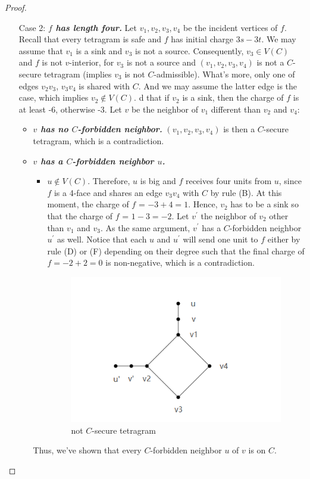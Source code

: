 \begin{proof}
\begin{itemize}
    \item[Case 2: ] \textit{\textbf{$f$ has length four.}} Let $v_1, v_2, v_3, v_4$ be the incident vertices of $f$. Recall that every tetragram is safe and $f$ has initial charge $3s - 3t$. We may assume that $v_1$ is a sink and $v_3$ is not a source. Consequently, $v_3 \in V(C)$ and $f$ is not $v$-interior, for $v_3$ is not a source and $(v_1, v_2, v_3, v_4)$ is not a $C$-secure tetragram (implies $v_3$ is not $C$-admissible). What's more, only one of edges $v_2v_3$, $v_3v_4$ is shared with $C$. And we may assume the latter edge is the case, which implies $v_2 \notin V(C)$. d that if $v_2$ is a sink, then the charge of $f$ is at least -6, otherwise -3. Let $v$ be the neighbor of $v_1$ different than $v_2$ and $v_4$: 
    \begin{itemize}
        \item \textit{\textbf{$v$ has no $C$-forbidden neighbor.}} $(v_1, v_2, v_3, v_4)$ is then a $C$-secure tetragram, which is a contradiction.
        
        \item \textit{\textbf{$v$ has a $C$-forbidden neighbor $u$.}} 
            \begin{itemize}
                \item $u \notin V(C)$. Therefore, $u$ is big and $f$ receives four units from $u$, since $f$ is a 4-face and shares an edge $v_3v_4$ with $C$ by rule (B). At this moment, the charge of $f$ = $-3 + 4 = 1$. Hence, $v_2$ has to be a sink so that the charge of $f$ = $1 - 3 = -2$. Let $v^{'}$ the neighbor of $v_2$ other than $v_1$ and $v_3$. As the same argument, $v^{'}$ has a $C$-forbidden neighbor $u^{'}$ as well. Notice that each $u$ and $u^{'}$ will send one unit to $f$ either by rule (D) or (F) depending on their degree such that the final charge of $f = -2 + 2 = 0$ is non-negative, which is a contradiction. 
                \begin{figure}[H] %
                    \centering %
                    \includegraphics[width=0.5 \textwidth]{figure/notcsecuretetragram.png} 
                    \caption{not $C$-secure tetragram} %
                    \label{figure} %
                \end{figure}
            \end{itemize}
        Thus, we've shown that every $C$-forbidden neighbor $u$ of $v$ is on $C$.
        

\end{itemize}
\end{itemize}
\end{proof}
